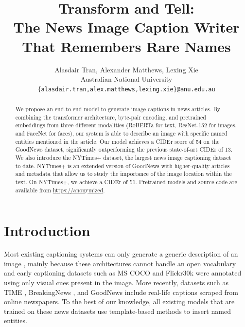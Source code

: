 \documentclass[10pt,twocolumn,letterpaper]{article}
\begin{document}
\title{Transform and Tell:\\The News Image Caption Writer That Remembers Rare Names}

\author{Alasdair Tran, Alexander Matthews, Lexing Xie\\
Australian National University\\
{\tt\small \{alasdair.tran,alex.matthews,lexing.xie\}@anu.edu.au}
}

\maketitle

\begin{abstract}
   We propose an end-to-end model to generate image captions in news articles.
   By combining the transformer architecture, byte-pair encoding, and
   pretrained embeddings from three different modalities (RoBERTa for text,
   ResNet-152 for images, and FaceNet for faces), our system is able to
   describe an image with specific named entities mentioned in the article. Our
   model achieves a CIDEr score of 54 on the GoodNews dataset, significantly
   outperforming the previous state-of-art CIDEr of 13. We also introduce the
   NYTimes+ dataset, the largest news image captioning dataset to date.
   NYTimes+ is an extended version of GoodNews with higher-quality articles and
   metadata that allow us to study the importance of the image location within
   the text. On NYTimes+, we achieve a CIDEr of 51. Pretrained models and
   source code are available from
   \href{https://github.com}{https://anonymized}.
\end{abstract}

\section{Introduction}

Most existing captioning systems can only generate a generic description of an
image \cite{Vinyals2015ShowAT, Fang2015FromCT, Karpathy2015DeepVA,
Rennie2017SelfCriticalST, Lu2017KnowingWT, Anderson2017BottomUpAT}, mainly
because these architectures cannot handle an open vocabulary and early
captioning datasets such as MS COCO \cite{Lin2014MicrosoftCC,
Chen2015MicrosoftCC} and Flickr30k \cite{Young2014FromID} were annotated using
only visual cues present in the image. More recently, datasets such as TIME
\cite{Tariq2017ACE}, BreakingNews \cite{Ramisa2016BreakingNewsAA}, and GoodNews
\cite{Biten2019GoodNews} include real-life captions scraped from online
newspapers. To the best of our knowledge, all existing models that are trained
on these news datasets use template-based methods to insert named entities.
\end{document}
